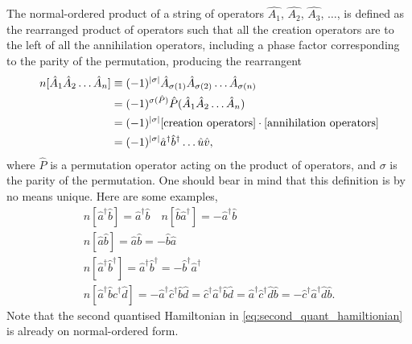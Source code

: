         The normal-ordered product of a string of operators $\hat{A_1}$, $\hat{A_2}$,
        $\hat{A_3}$, $\dots$, is defined as the rearranged product of operators such 
        that all the creation operators are to the left of all the annihilation
        operators, including a phase factor corresponding to the parity of the
        permutation, producing the rearrangent
        \begin{equation} 
            \begin{aligned}
            n[\hat{A}_1\hat{A}_2 \dots \hat{A}_n ]
            &\equiv (-1)^{\abs{\sigma}}
                \hat{A}_{\sigma(1)}\hat{A}_{\sigma(2)} \dots \hat{A}_{\sigma(n)} \\
            &= (-1)^{\sigma(\hat{P})}\hat{P}(\hat{A}_1\hat{A}_2 \dots \hat{A}_n) \\
            &= (-1)^{\abs{\sigma}}
            [\text{creation operators}] \cdot [\text{annihilation operators}] \\
            &= (-1)^{\abs{\sigma}}\hat{a}^\dagger \hat{b}^\dagger \dots \hat{u} \hat{v},
            \end{aligned}
        \end{equation}
        where $\hat{P}$ is a permutation operator acting on the product of operators, 
        and $\sigma$ is the parity of the permutation. One should bear in mind that this 
        definition is by no means unique. Here are some examples,
        \begin{gather*}
            n[\hat{a}^\dagger \hat{b}] = \hat{a}^\dagger \hat{b} \quad
            n[\hat{b} \hat{a}^\dagger] = -\hat{a}^\dagger \hat{b} \\
            n[\hat{a} \hat{b} ] = \hat{a} \hat{b} = - \hat{b} \hat{a} \\
            n[\hat{a}^\dagger\hat{b}^\dagger ]
                = \hat{a}^\dagger \hat{b}^\dagger 
                = -\hat{b}^\dagger \hat{a}^\dagger \\
            n[\hat{a}^\dagger \hat{b} \hat{c}^\dagger \hat{d}]
                = -\hat{a}^\dagger \hat{c}^\dagger\hat{b} \hat{d} 
                = \hat{c}^\dagger \hat{a}^\dagger\hat{b} \hat{d} 
                = \hat{a}^\dagger \hat{c}^\dagger\hat{d} \hat{b} 
                = -\hat{c}^\dagger \hat{a}^\dagger\hat{d} \hat{b}.
        \end{gather*}
        Note that the second quantised Hamiltonian in \autoref{eq:second_quant_hamiltionian}
        is already on normal-ordered form.

